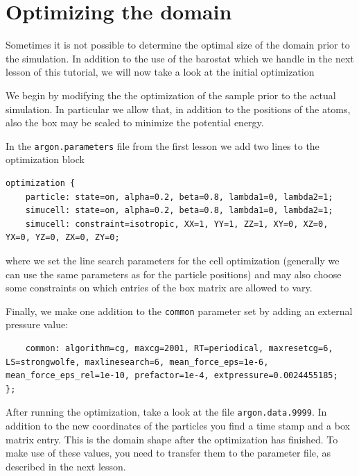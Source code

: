 \section{Optimizing the domain}
\label{sec:domain_opt}
Sometimes it is not possible to determine the optimal size of the domain
prior to the simulation. In addition to the use of the barostat which we
handle in the next lesson of this tutorial, we will now take a look at the
initial optimization

We begin by modifying the the optimization of the sample prior to the actual 
simulation. In particular we allow that, in addition to the positions of
the atoms, also the box may be scaled to minimize the potential energy.

In the \texttt{argon.parameters} file from the first lesson we add two lines
to the optimization block
\begin{lstlisting}
optimization {
    particle: state=on, alpha=0.2, beta=0.8, lambda1=0, lambda2=1;
    simucell: state=on, alpha=0.2, beta=0.8, lambda1=0, lambda2=1;
    simucell: constraint=isotropic, XX=1, YY=1, ZZ=1, XY=0, XZ=0, YX=0, YZ=0, ZX=0, ZY=0;
\end{lstlisting}
where we set the line search parameters for the cell optimization (generally we can use the same parameters as for the particle positions) and
may also choose some constraints on which entries of the box matrix are allowed to vary.

Finally, we make one addition to the \texttt{common} parameter set by adding an external pressure value:
\begin{lstlisting}
    common: algorithm=cg, maxcg=2001, RT=periodical, maxresetcg=6, LS=strongwolfe, maxlinesearch=6, mean_force_eps=1e-6, mean_force_eps_rel=1e-10, prefactor=1e-4, extpressure=0.0024455185;
};
\end{lstlisting}

After running the optimization, take a look at the file \texttt{argon.data.9999}. In addition to the new coordinates of the particles you find a time stamp and a box matrix entry. This is the domain shape after the optimization has finished. To make use of these values, you need to transfer them to the parameter file, as described in the next lesson.

